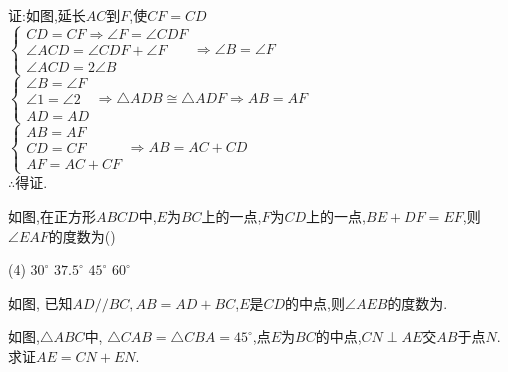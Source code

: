 \documentclass[cn,blue,12pt]{elegantbook}
\renewcommand \tkt[1]{{\CJKunderline[hidden=true, skip=true, thickness=1pt]{#1}}}
\begin{document}
\begin{liti}
\begin{solution}
        证:如图,延长\(AC\)到\(F\),使\(CF=CD\)\\
        \(\begin{cases} CD=CF \Rightarrow \angle F = \angle CDF\\ \angle ACD=\angle CDF + \angle F \\ \angle ACD = 2\angle B \end{cases} \Rightarrow \angle B = \angle F\)\\
        \(\begin{cases} \angle B = \angle F\\ \angle 1 = \angle 2\\ AD=AD \end{cases} \Rightarrow \triangle ADB \cong \triangle ADF \Rightarrow AB=AF\)\\
        \(\begin{cases} AB=AF\\ CD = CF\\ AF=AC+CF \end{cases}\Rightarrow AB=AC+CD\)\\
        \(\therefore \)得证.
\end{solution}
\end{liti}
\begin{shiti}
\item 如图,在正方形\(ABCD\)中,\(E\)为\(BC\)上的一点,\(F\)为\(CD\)上的一点,\(BE + DF = EF\),则\(\angle EAF\)的度数为(\qquad)\\
    \begin{tasks}(4)
        \task \(30 ^\circ\)
        \task \(37.5 ^\circ\)
        \task \(45 ^\circ\)
        \task \(60 ^\circ\)
    \end{tasks}
\item 如图, 已知\(AD // BC,AB = AD + BC\),\(E\)是\(CD\)的中点,则\(\angle AEB\)的度数为\tkt{\qquad}.
\item 如图,\(\triangle ABC\)中, \(\triangle CAB = \triangle CBA =45^\circ\),点\(E\)为\(BC\)的中点,\(CN \perp AE\)交\(AB\)于点\(N\).求证\(AE=CN+EN\).
\end{shiti}
\end{document}
